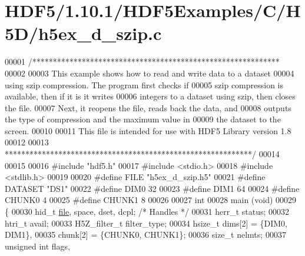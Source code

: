 \hypertarget{_h_d_f5_21_810_81_2_h_d_f5_examples_2_c_2_h5_d_2h5ex__d__szip_8c_source}{}\section{H\+D\+F5/1.10.1/\+H\+D\+F5\+Examples/\+C/\+H5\+D/h5ex\+\_\+d\+\_\+szip.c}
\label{_h_d_f5_21_810_81_2_h_d_f5_examples_2_c_2_h5_d_2h5ex__d__szip_8c_source}

\begin{DoxyCode}
00001 \textcolor{comment}{/************************************************************}
00002 \textcolor{comment}{}
00003 \textcolor{comment}{  This example shows how to read and write data to a dataset}
00004 \textcolor{comment}{  using szip compression.    The program first checks if}
00005 \textcolor{comment}{  szip compression is available, then if it is it writes}
00006 \textcolor{comment}{  integers to a dataset using szip, then closes the file.}
00007 \textcolor{comment}{  Next, it reopens the file, reads back the data, and}
00008 \textcolor{comment}{  outputs the type of compression and the maximum value in}
00009 \textcolor{comment}{  the dataset to the screen.}
00010 \textcolor{comment}{}
00011 \textcolor{comment}{  This file is intended for use with HDF5 Library version 1.8}
00012 \textcolor{comment}{}
00013 \textcolor{comment}{ ************************************************************/}
00014 
00015 
00016 \textcolor{preprocessor}{#include "hdf5.h"}
00017 \textcolor{preprocessor}{#include <stdio.h>}
00018 \textcolor{preprocessor}{#include <stdlib.h>}
00019 
00020 \textcolor{preprocessor}{#define FILE            "h5ex\_d\_szip.h5"}
00021 \textcolor{preprocessor}{#define DATASET         "DS1"}
00022 \textcolor{preprocessor}{#define DIM0            32}
00023 \textcolor{preprocessor}{#define DIM1            64}
00024 \textcolor{preprocessor}{#define CHUNK0          4}
00025 \textcolor{preprocessor}{#define CHUNK1          8}
00026 
00027 \textcolor{keywordtype}{int}
00028 main (\textcolor{keywordtype}{void})
00029 \{
00030     hid\_t           \hyperlink{structfile}{file}, space, dset, dcpl;    \textcolor{comment}{/* Handles */}
00031     herr\_t          status;
00032     htri\_t          avail;
00033     H5Z\_filter\_t    filter\_type;
00034     hsize\_t         dims[2] = \{DIM0, DIM1\},
00035                     chunk[2] = \{CHUNK0, CHUNK1\};
00036     \textcolor{keywordtype}{size\_t}          nelmts;
00037     \textcolor{keywordtype}{unsigned} \textcolor{keywordtype}{int}    flags,

\end{DoxyCode}
